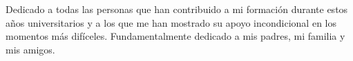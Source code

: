 \begin{dedication}
    Dedicado a todas las personas que han contribuido a mi formaci\'on durante estos a\~nos universitarios y a los que me han mostrado su apoyo incondicional en los momentos m\'as dif\'iceles. Fundamentalmente dedicado a mis padres, mi familia y mis amigos.
\end{dedication}